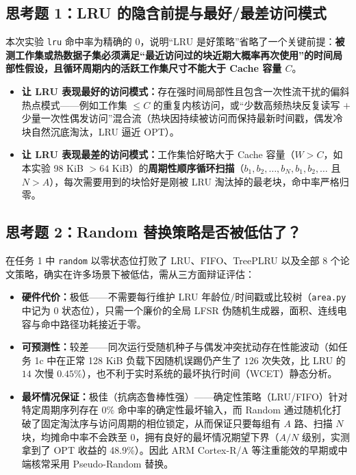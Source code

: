 \documentclass[12pt,a4paper,fontset=mac]{ctexart}
\begin{document}
\subsection*{思考题 1：LRU 的隐含前提与最好/最差访问模式}
本次实验 \texttt{lru} 命中率为精确的 0，说明“LRU 是好策略”省略了一个关键前提：\textbf{被测工作集或热数据子集必须满足“最近访问过的块近期大概率再次使用”的时间局部性假设，且循环周期内的活跃工作集尺寸不能大于 Cache 容量 $C$}。
\begin{itemize}
  \item \textbf{让 LRU 表现最好的访问模式：}存在强时间局部性且包含一次性流干扰的偏斜热点模式——例如工作集 $\le C$ 的重复内核访问，或“少数高频热块反复读写 $+$ 少量一次性偶发访问”混合流（热块因持续被访问而保持最新时间戳，偶发冷块自然沉底淘汰，LRU 逼近 OPT）。
  \item \textbf{让 LRU 表现最差的访问模式：}工作集恰好略大于 Cache 容量（$W > C$，如本实验 98 KiB $> 64$ KiB）的\textbf{周期性顺序循环扫描}（$b_1, b_2, \dots, b_N, b_1, b_2, \dots$ 且 $N > A$），每次需要用到的块恰好是刚被 LRU 淘汰掉的最老块，命中率严格归零。
\end{itemize}

\subsection*{思考题 2：Random 替换策略是否被低估了？}
在任务 1 中 \texttt{random} 以零状态位打败了 LRU、FIFO、TreePLRU 以及全部 8 个论文策略，确实在许多场景下被低估，需从三方面辩证评估：
\begin{itemize}
  \item \textbf{硬件代价：}极低——不需要每行维护 LRU 年龄位/时间戳或比较树（\texttt{area.py} 中记为 0 状态位），只需一个廉价的全局 LFSR 伪随机生成器，面积、连线电容与命中路径功耗接近于零。
  \item \textbf{可预测性：}较差——同次运行受随机种子与偶发冲突扰动存在性能波动（如任务 1c 中在正常 128 KiB 负载下因随机误踢仍产生了 $126$ 次失效，比 LRU 的 $14$ 次慢 $0.45\%$），也不利于实时系统的最坏执行时间（WCET）静态分析。
  \item \textbf{最坏情况保证：}极佳（抗病态鲁棒性强）——确定性策略（LRU/FIFO）针对特定周期序列存在 0\% 命中率的确定性最坏输入，而 Random 通过随机化打破了固定淘汰序与访问周期的相位锁定，从而保证只要每组有 $A$ 路、扫描 $N$ 块，均摊命中率不会跌至 0，拥有良好的最坏情况期望下界（$A/N$ 级别，实测拿到了 OPT 收益的 48.9\%）。因此 ARM Cortex-R/A 等注重能效的早期或中端核常采用 Pseudo-Random 替换。
\end{itemize}
\end{document}

